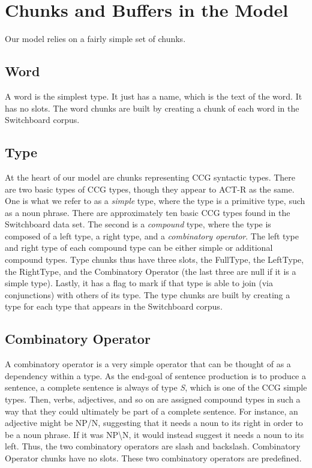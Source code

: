 \section{Chunks and Buffers in the Model}
Our model relies on a fairly simple set of chunks. 

\subsection{Word}
A word is the simplest type. It just has a name, which is the text of the word. It has no slots. The word chunks are built by creating a chunk of each word in the Switchboard corpus.

\subsection{Type}
At the heart of our model are chunks representing CCG syntactic types. There are two basic types of CCG types, though they appear to ACT-R as the same. One is what we refer to as a \textit{simple} type, where the type is a primitive type, such as a noun phrase. There are approximately ten basic CCG types found in the Switchboard data set. The second is a \textit{compound} type, where the type is composed of a left type, a right type, and a \textit{combinatory operator}. The left type and right type of each compound type can be either simple or additional compound types. Type chunks thus have three slots, the FullType, the LeftType, the RightType, and the Combinatory Operator (the last three are null if it is a simple type). Lastly, it has a flag to mark if that type is able to join (via conjunctions) with others of its type. The type chunks are built by creating a type for each type that appears in the Switchboard corpus.

\subsection{Combinatory Operator}
A combinatory operator is a very simple operator that can be thought of as a dependency within a type. As the end-goal of sentence production is to produce a sentence, a complete sentence is always of type \textit{S}, which is one of the CCG simple types. Then, verbs, adjectives, and so on are assigned compound types in such a way that they could ultimately be part of a complete sentence. For instance, an adjective might be NP/N, suggesting that it needs a noun to its right in order to be a noun phrase. If it was NP\textbackslash N, it would instead suggest it needs a noun to its left. Thus, the two combinatory operators are slash and backslash. Combinatory Operator chunks have no slots. These two combinatory operators are predefined.


